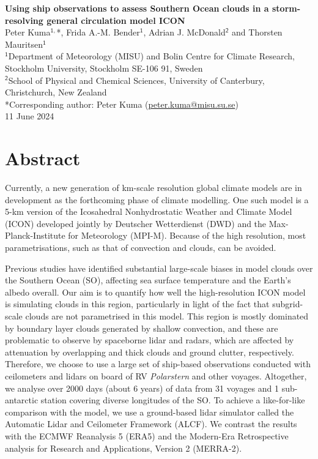 \documentclass[12pt,a4paper]{article}
\begin{document}
\begin{center} \Large \sffamily\textbf{Using ship observations to assess Southern Ocean clouds in a storm-resolving general circulation model ICON}\\[0.4cm]
\large Peter Kuma$^\mathsf{1,}$*, Frida A.-M. Bender$^\mathsf{1}$, Adrian J. McDonald$^\mathsf{2}$ and Thorsten Mauritsen$^\mathsf{1}$\\[0.4cm]
\small
$^\mathsf{1}$Department of Meteorology (MISU) and Bolin Centre for Climate Research, Stockholm University, Stockholm SE-106 91, Sweden\\[0.2cm]
$^\mathsf{2}$School of Physical and Chemical Sciences, University of Canterbury, Christchurch, New Zealand\\[0.2cm]
*Corresponding author: Peter Kuma (\href{mailto:peter.kuma@misu.su.se}{peter.kuma@misu.su.se})\\[0.4cm]
\large 11 June 2024\\[0.4cm]

\end{center}

\section*{Abstract}

Currently, a new generation of km-scale resolution global climate models are in development as the forthcoming phase of climate modelling. One such model is a 5-km version of the Icosahedral Nonhydrostatic Weather and Climate Model (ICON) developed jointly by Deutscher Wetterdienst (DWD) and the Max-Planck-Institute for Meteorology (MPI-M). Because of the high resolution, most parametrisations, such as that of convection and clouds, can be avoided.

Previous studies have identified substantial large-scale biases in model clouds over the Southern Ocean (SO), affecting sea surface temperature and the Earth's albedo overall. Our aim is to quantify how well the high-resolution ICON model is simulating clouds in this region, particularly in light of the fact that subgrid-scale clouds are not parametrised in this model. This region is mostly dominated by boundary layer clouds generated by shallow convection, and these are problematic to observe by spaceborne lidar and radars, which are affected by attenuation by overlapping and thick clouds and ground clutter, respectively. Therefore, we choose to use a large set of ship-based observations conducted with ceilometers and lidars on board of RV \textit{Polarstern} and other voyages. Altogether, we analyse over 2000 days (about 6 years) of data from 31 voyages and 1 sub-antarctic station covering diverse longitudes of the SO. To achieve a like-for-like comparison with the model, we use a ground-based lidar simulator called the Automatic Lidar and Ceilometer Framework (ALCF). We contrast the results with the ECMWF Reanalysis 5 (ERA5) and the Modern-Era Retrospective analysis for Research and Applications, Version 2 (MERRA-2).
\end{document}
